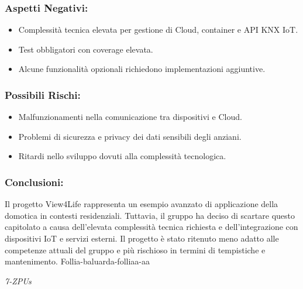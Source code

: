 \documentclass[a4paper,12pt]{article}
\begin{document}
\subsubsection*{Aspetti Negativi:}
\begin{itemize}
    \item Complessità tecnica elevata per gestione di Cloud, container e API KNX IoT.
    \item Test obbligatori con coverage elevata.
    \item Alcune funzionalità opzionali richiedono implementazioni aggiuntive.
\end{itemize}

\subsubsection*{Possibili Rischi:}
\begin{itemize}
    \item Malfunzionamenti nella comunicazione tra dispositivi e Cloud.
    \item Problemi di sicurezza e privacy dei dati sensibili degli anziani.
    \item Ritardi nello sviluppo dovuti alla complessità tecnologica.
\end{itemize}

\subsubsection*{Conclusioni:}
Il progetto View4Life rappresenta un esempio avanzato di applicazione della domotica in contesti residenziali. Tuttavia, il gruppo ha deciso di scartare questo capitolato a causa dell'elevata complessità tecnica richiesta e dell'integrazione con dispositivi IoT e servizi esterni. Il progetto è stato ritenuto meno adatto alle competenze attuali del gruppo e più rischioso in termini di tempistiche e mantenimento.
Follia-baluarda-folliaa-aa
\vspace{0.5cm}

\vfill
\begin{flushright}
    \textit{7-ZPUs}
\end{flushright}
\end{document}

